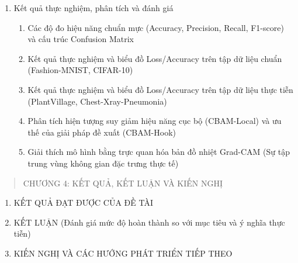 \documentclass[
]{article}
\begin{document}
\begin{enumerate}
\begin{enumerate}
\begin{enumerate}
\begin{enumerate}
      \item
        Mô hình 3 (CBAM-Hook - Đề xuất cải tiến): Chèn CBAM phân cấp tại các điểm nối và cuối mạng
      \end{enumerate}
    \item
      Cấu hình quá trình huấn luyện và tối ưu hóa
      \begin{enumerate}
      \def\labelenumiv{3.3.1.5.\arabic{enumiv}.}
      \item
        Bộ tối ưu SGD và các hàm Loss tương ứng
      \item
        Hàm gọi lại tự động giảm tốc độ học (ReduceLROnPlateau) và dừng sớm (EarlyStopping)
      \end{enumerate}
    \end{enumerate}
  \item
    Kết quả thực nghiệm, phân tích và đánh giá
    \begin{enumerate}
    \def\labelenumiii{3.3.2.\arabic{enumiii}.}
    \item
      Các độ đo hiệu năng chuẩn mực (Accuracy, Precision, Recall, F1-score) và cấu trúc Confusion Matrix
    \item
      Kết quả thực nghiệm và biểu đồ Loss/Accuracy trên tập dữ liệu chuẩn (Fashion-MNIST, CIFAR-10)
    \item
      Kết quả thực nghiệm và biểu đồ Loss/Accuracy trên tập dữ liệu thực tiễn (PlantVillage, Chest-Xray-Pneumonia)
    \item
      Phân tích hiện tượng suy giảm hiệu năng cục bộ (CBAM-Local) và ưu thế của giải pháp đề xuất (CBAM-Hook)
    \item
      Giải thích mô hình bằng trực quan hóa bản đồ nhiệt Grad-CAM (Sự tập trung vùng không gian đặc trưng thực tế)
    \end{enumerate}
  \end{enumerate}
\end{enumerate}

\begin{quote}
CHƯƠNG 4: KẾT QUẢ, KẾT LUẬN VÀ KIẾN NGHỊ
\end{quote}

\begin{enumerate}
\def\labelenumi{4.\arabic{enumi}.}
\item
  KẾT QUẢ ĐẠT ĐƯỢC CỦA ĐỀ TÀI
\item
  KẾT LUẬN (Đánh giá mức độ hoàn thành so với mục tiêu và ý nghĩa thực tiễn)
\item
  KIẾN NGHỊ VÀ CÁC HƯỚNG PHÁT TRIỂN TIẾP THEO
\end{enumerate}
\end{document}
